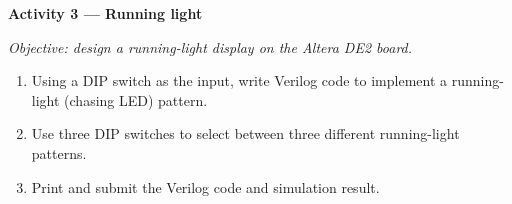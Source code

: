\begin{procedure}
    \textbf{Activity 3 --- Running light}\vspace{2pt}

    \textit{Objective: design a running-light display on the Altera DE2 board.}

    \begin{enumerate}
        \item Using a DIP switch as the input, write Verilog code to implement a running-light (chasing LED) pattern.
        \item Use three DIP switches to select between three different running-light patterns.
        \item Print and submit the Verilog code and simulation result.
    \end{enumerate}

\end{procedure}
